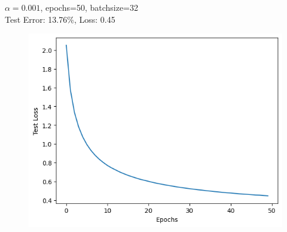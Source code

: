 \documentclass[a4paper]{article}
\theoremstyle{definition}
\newenvironment{soln}{
    \leavevmode\color{blue}\ignorespaces
}{}
\begin{document}
\begin{enumerate}
\begin{soln}
        $\alpha=0.001$, epochs=50, batchsize=32\\
        Test Error: 13.76\%, Loss: 0.45
        \begin{figure}[H]
            \centering
            \includegraphics[scale=0.5]{Images/32_0.001.png}
        \end{figure}


\end{soln}
\end{enumerate}
\end{document}

